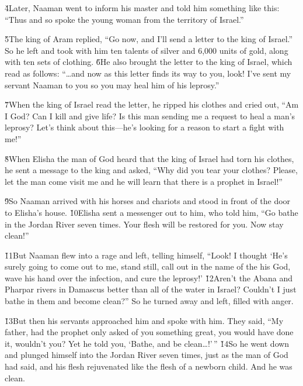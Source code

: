 \v{4}Later, Naaman went to inform his master and told him something like this: ``Thus and so spoke the young woman from the territory of Israel.''

\v{5}The king of Aram replied, ``Go now, and I'll send a letter to the king of Israel.'' So he left and took with him ten talents of silver and 6,000 units of gold, along with ten sets of clothing. \v{6}He also brought the letter to the king of Israel, which read as follows: ``{\ldots}and now as this letter finds its way to you, look! I've sent my servant Naaman to you so you may heal him of his leprosy.''

\v{7}When the king of Israel read the letter, he ripped his clothes and cried out, ``Am I God? Can I kill and give life? Is this man sending me a request to heal a man's leprosy? Let's think about this---he's looking for a reason to start a fight with me!''

\v{8}When Elisha the man of God heard that the king of Israel had torn his clothes, he sent a message to the king and asked, ``Why did you tear your clothes? Please, let the man come visit me and he will learn that there is a prophet in Israel!''

\v{9}So Naaman arrived with his horses and chariots and stood in front of the door to Elisha's house. \v{10}Elisha sent a messenger out to him, who told him, ``Go bathe in the Jordan River seven times. Your flesh will be restored for you. Now stay clean!''

\v{11}But Naaman flew into a rage and left, telling himself, ``Look! I thought `He's surely going to come out to me, stand still, call out in the name of the  his God, wave his hand over the infection, and cure the leprosy!' \v{12}Aren't the Abana and Pharpar rivers in Damascus better than all of the water in Israel? Couldn't I just bathe in them and become clean?'' So he turned away and left, filled with anger.

\v{13}But then his servants approached him and spoke with him. They said, ``My father, had the prophet only asked of you something great, you would have done it, wouldn't you? Yet he told you, `Bathe, and be clean{\ldots}!'\,'' \v{14}So he went down and plunged himself into the Jordan River seven times, just as the man of God had said, and his flesh rejuvenated like the flesh of a newborn child. And he was clean.

